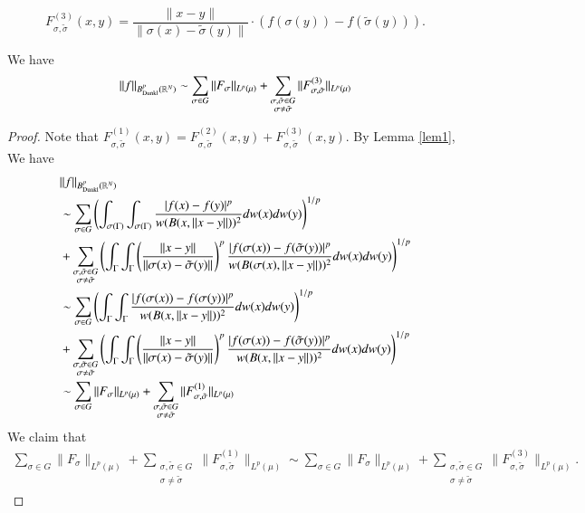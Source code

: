 \documentclass[12pt]{amsart}
\begin{document}
$$F_{\sigma,\tilde{\sigma}}^{(3)}(x,y)=\frac{\|x-y\|}{\|\sigma(x)-\tilde{\sigma}(y)\|}\cdot(f(\sigma(y))-f(\tilde{\sigma}(y))).$$
\begin{lemma}
We have
$$\|f\|_{B^{p}_{{\rm Dunkl}}(\mathbb{R}^N)}\sim \sum_{\sigma\in G} \|F_{\sigma}\|_{L^p(\mu)}+\sum_{\substack{\sigma,\tilde{\sigma}\in G\\ \sigma\neq \tilde{\sigma}}}\|F_{\sigma,\tilde{\sigma}}^{(3)}\|_{L^p(\mu)}$$
\end{lemma}
\begin{proof}
Note that
$F_{\sigma,\tilde{\sigma}}^{(1)}(x,y)=F_{\sigma,\tilde{\sigma}}^{(2)}(x,y)+F_{\sigma,\tilde{\sigma}}^{(3)}(x,y).$
By Lemma \ref{lem1},
We have
\begin{align}\label{susti}
&\|f\|_{B^{p}_{{\rm Dunkl}}(\mathbb{R}^N)}\nonumber\\
&\sim  \sum_{\sigma\in G} \left(\int_{\sigma(\Gamma)}\int_{\sigma(\Gamma)}\frac{|f(x)-f(y)|^p}{w(B(x,\|x-y\|))^2}dw(x)dw(y)\right)^{1/p}\nonumber\\
&+\sum_{\substack{\sigma,\tilde{\sigma}\in G\\ \sigma\neq \tilde{\sigma}}}\left(\int_{\Gamma}\int_{\Gamma}\left(\frac{\|x-y\|}{\|\sigma(x)-\tilde{\sigma}(y)\|}\right)^{p}\frac{|f(\sigma(x))-f(\tilde{\sigma}(y))|^p}{w(B(\sigma(x),\|x-y\|))^2}dw(x)dw(y)\right)^{1/p}\nonumber\\
&\sim  \sum_{\sigma\in G} \left(\int_{\Gamma}\int_{\Gamma}\frac{|f(\sigma(x))-f(\sigma(y))|^p}{w(B(x,\|x-y\|))^2}dw(x)dw(y)\right)^{1/p}\nonumber\\
&+\sum_{\substack{\sigma,\tilde{\sigma}\in G\\ \sigma\neq \tilde{\sigma}}}\left(\int_{\Gamma}\int_{\Gamma}\left(\frac{\|x-y\|}{\|\sigma(x)-\tilde{\sigma}(y)\|}\right)^{p}\frac{|f(\sigma(x))-f(\tilde{\sigma}(y))|^p}{w(B(x,\|x-y\|))^2}dw(x)dw(y)\right)^{1/p}\nonumber\\
&\sim  \sum_{\sigma\in G} \|F_{\sigma}\|_{L^p(\mu)}+\sum_{\substack{\sigma,\tilde{\sigma}\in G\\ \sigma\neq \tilde{\sigma}}}\|F_{\sigma,\tilde{\sigma}}^{(1)}\|_{L^p(\mu)}
\end{align}
We claim that
\begin{align}\label{claim1}
\sum_{\sigma\in G} \|F_{\sigma}\|_{L^p(\mu)}+\sum_{\substack{\sigma,\tilde{\sigma}\in G\\ \sigma\neq \tilde{\sigma}}}\|F_{\sigma,\tilde{\sigma}}^{(1)}\|_{L^p(\mu)}\sim \sum_{\sigma\in G} \|F_{\sigma}\|_{L^p(\mu)}+\sum_{\substack{\sigma,\tilde{\sigma}\in G\\ \sigma\neq \tilde{\sigma}}}\|F_{\sigma,\tilde{\sigma}}^{(3)}\|_{L^p(\mu)}.

\end{align}
\end{proof}
\end{document}
